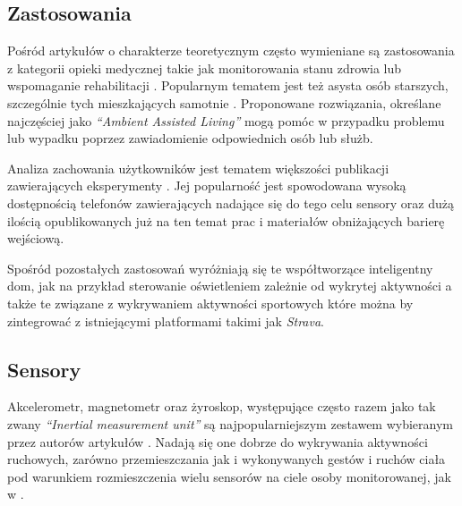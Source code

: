 \subsection{Zastosowania}
Pośród artykułów o charakterze teoretycznym często wymieniane są zastosowania z kategorii opieki medycznej takie jak monitorowania stanu zdrowia \cite{22_HAR_Survey_Ultrasonic} lub wspomaganie rehabilitacji \cite{35_HAR_Wearable_Review}. Popularnym tematem jest też asysta osób starszych, szczególnie tych mieszkających samotnie \cite{21_HAR_Smartphone}. Proponowane rozwiązania, określane najczęściej jako \textit{``Ambient Assisted Living''} mogą pomóc w przypadku problemu lub wypadku poprzez zawiadomienie odpowiednich osób lub służb.

Analiza zachowania użytkowników jest tematem większości publikacji zawierających eksperymenty \cite{2_Real_Time_HAR, 59_Air_Pressure_HAR, 33_Inertial_Study}. Jej popularność jest spowodowana wysoką dostępnością telefonów zawierających nadające się do tego celu sensory oraz dużą ilością opublikowanych już na ten temat prac i materiałów obniżających barierę wejściową.

Spośród pozostałych zastosowań wyróżniają się te współtworzące inteligentny dom, jak na przykład sterowanie oświetleniem zależnie od wykrytej aktywności \cite{36_Smart_Home_HAR} a także te związane z wykrywaniem aktywności sportowych \cite{29_Daily_Sport_HAR} które można by zintegrować z istniejącymi platformami takimi jak \textit{Strava}.


\subsection{Sensory}
Akcelerometr, magnetometr oraz żyroskop, występujące często razem jako tak zwany \textit{``Inertial measurement unit''} są najpopularniejszym zestawem wybieranym przez autorów artykułów \cite{30_Context_Awareness, 32_Accel_Phone_HAR}. Nadają się one dobrze do wykrywania aktywności ruchowych, zarówno przemieszczania jak i wykonywanych gestów i ruchów ciała pod warunkiem rozmieszczenia wielu sensorów na ciele osoby monitorowanej, jak w \cite{29_Daily_Sport_HAR}.

